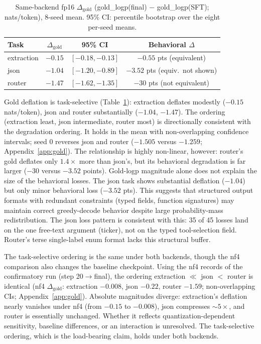 \documentclass{article}
\begin{document}
\begin{table}[H]
\centering
\caption{Same-backend fp16 $\Delta_{\text{gold}}$ (gold\_logp(final) $-$ gold\_logp(SFT); nats/token), 8-seed mean. 95\% CI: percentile bootstrap over the eight per-seed means.}
\label{tab:gold}
\small
\begin{tabular}{@{}lccc@{}}
\toprule
Task & $\Delta_{\text{gold}}$ & 95\% CI & Behavioral $\Delta$\\
\midrule
extraction & $-0.15$ & $[-0.18, -0.13]$ & $-0.55$ pts (equivalent)\\
json & $-1.04$ & $[-1.20, -0.89]$ & $-3.52$ pts (equiv.\ not shown)\\
router & $-1.47$ & $[-1.62, -1.35]$ & $-30$ pts (not equivalent)\\
\bottomrule
\end{tabular}
\end{table}

Gold deflation is task-selective (Table~\ref{tab:gold}): extraction deflates modestly ($-0.15$ nats/token), json and router substantially ($-1.04$, $-1.47$). The ordering (extraction least, json intermediate, router most) is directionally consistent with the degradation ordering. It holds in the mean with non-overlapping confidence intervals; seed 0 reverses json and router ($-1.505$ versus $-1.259$; Appendix~\ref{app:gold}). The relationship is highly non-linear, however: router's gold deflates only $1.4\times$ more than json's, but its behavioral degradation is far larger ($-30$ versus $-3.52$ points). Gold-logp magnitude alone does not explain the size of the behavioral losses. The json task shows substantial deflation ($-1.04$) but only minor behavioral loss ($-3.52$ pts). This suggests that structured output formats with redundant constraints (typed fields, function signatures) may maintain correct greedy-decode behavior despite large probability-mass redistribution. The json loss pattern is consistent with this: 35 of 45 losses land on the one free-text argument (ticker), not on the typed tool-selection field. Router's terse single-label enum format lacks this structural buffer.

The task-selective ordering is the same under both backends, though the nf4 comparison also changes the baseline checkpoint. Using the nf4 records of the confirmatory run (step 20$\to$final), the ordering extraction $\ll$ json $<$ router is identical (nf4 $\Delta_{\text{gold}}$: extraction $-0.008$, json $-0.22$, router $-1.59$; non-overlapping CIs; Appendix~\ref{app:gold}). Absolute magnitudes diverge: extraction's deflation nearly vanishes under nf4 (from $-0.15$ to $-0.008$), json compresses ${\sim}5\times$, and router is essentially unchanged. Whether it reflects quantization-dependent sensitivity, baseline differences, or an interaction is unresolved. The task-selective ordering, which is the load-bearing claim, holds under both backends.
\end{document}
